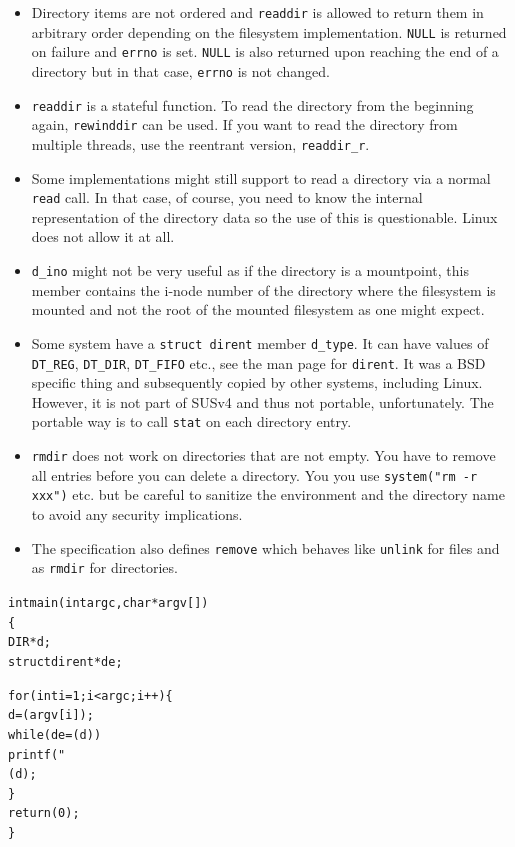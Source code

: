 \begin{itemize}
\item Directory items are not ordered and
\texttt{readdir} is allowed to return them in arbitrary order depending on the
filesystem implementation.  \texttt{NULL} is returned on failure
and \texttt{errno} is set.  \texttt{NULL} is also returned upon reaching the end
of a directory but in that case, \texttt{errno} is not changed.
\item \texttt{readdir} is a stateful function.  To read the directory from the
beginning again, \texttt{rewinddir} can be used.  If you want to read the
directory from multiple threads, use the reentrant version, \texttt{readdir\_r}.
\item Some implementations might still support to read a directory via a normal
\texttt{read} call.  In that case, of course, you need to know the internal
representation of the directory data so the use of this is questionable.  Linux
does not allow it at all.
\item \texttt{d\_ino} might not be very useful as if the directory is a
mountpoint, this member contains the i-node number of the directory where the
filesystem is mounted and not the root of the mounted filesystem as one might
expect.
\item \label{D_TYPE} Some system have a \texttt{struct dirent} member
\texttt{d\_type}.  It can have values of \texttt{DT\_REG}, \texttt{DT\_DIR},
\texttt{DT\_FIFO} etc., see the man page for \texttt{dirent}.  It was a BSD
specific thing and subsequently copied by other systems, including Linux.
However, it is not part of SUSv4 and thus not portable, unfortunately.
The portable way is to call \texttt{stat} on each directory entry.
\item \texttt{rmdir} does not work on directories that are not empty.  You have
to remove all entries before you can delete a directory.  You you use 
\texttt{system("rm -r xxx")} etc. but be careful to sanitize the environment and
the directory name to avoid any security implications.
\item \label{REMOVE} The specification also defines \texttt{remove} which
behaves like \texttt{unlink} for files and as \texttt{rmdir} for directories.
\end{itemize}


\begin{slide}
\begin{alltt}
int main(int argc, char *argv[])
\{
    DIR *d;
    struct dirent *de;

    for(int i = 1; i < argc; i++) \{
        d = (argv[i]);
        while(de = (d))
            printf("%
        (d);
    \} 
    return (0);
\}
\end{alltt}
\end{slide}


